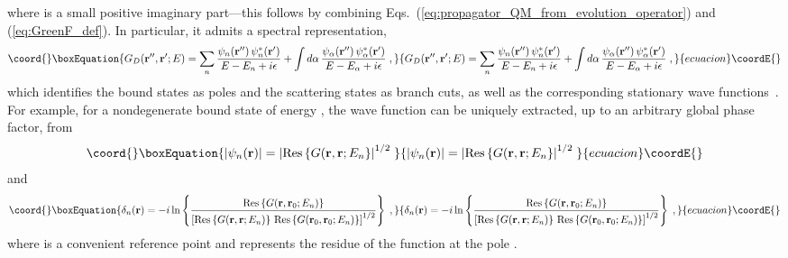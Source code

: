 \documentclass[a4paper,preprint,draft,showpacs,amsmath,amsfonts,amssymb,aps,prd]{revtex4}%
\begin{document}
where \coordHE{} is a small positive imaginary part---this follows by combining
Eqs.~(\ref{eq:propagator_QM_from_evolution_operator})
 and (\ref{eq:GreenF_def}).
In particular, it
admits a spectral representation,
\begin{equation}\coord{}\boxEquation{
G_{D} ({\bf r}'', {\bf r}' ; E) 
=
\sum_{n}
\frac{ 
\psi_{n} ({\bf r}'')  \, \psi_{n} ^{*}({\bf r}')  
}{E-E_{n} +i \epsilon}
+
\int d \alpha
\,
\frac{
\psi_{\alpha} ({\bf r}'')  \, \psi_{\alpha} ^{*}({\bf r}')  
}{E-E_{\alpha} +i \epsilon}
\;  ,
\label{eq:energy_propagator_states}
}{
G_{D} ({\bf r}'', {\bf r}' ; E) 
=
\sum_{n}
\frac{ 
\psi_{n} ({\bf r}'')  \, \psi_{n} ^{*}({\bf r}')  
}{E-E_{n} +i \epsilon}
+
\int d \alpha
\,
\frac{
\psi_{\alpha} ({\bf r}'')  \, \psi_{\alpha} ^{*}({\bf r}')  
}{E-E_{\alpha} +i \epsilon}
\;  ,
}{ecuacion}\coordE{}\end{equation}
which identifies
the bound states as poles and the scattering states 
as branch cuts, as well as the corresponding
stationary wave functions~\cite{kleinert}.
For example,
for a nondegenerate bound state of energy \coordHE{},
the wave function
\coordHE{}
can be uniquely extracted, up to an arbitrary global phase factor, from
\begin{equation}\coord{}\boxEquation{
|\psi_{n}({\bf r}) |
=
\left|
{\rm Res} \left\{ G({\bf r},{\bf r}; E_{n} 
\right\}
\right|^{1/2}
\;  
\label{eq:residue_magnitude_wf}
}{
|\psi_{n}({\bf r}) |
=
\left|
{\rm Res} \left\{ G({\bf r},{\bf r}; E_{n} 
\right\}
\right|^{1/2}
\;  
}{ecuacion}\coordE{}\end{equation}
and
\begin{equation}\coord{}\boxEquation{
\delta_{n}({\bf r}) 
=
- i \ln
\left\{
\frac{
{\rm Res} \left\{ G({\bf r},{\bf r}_{0}; E_{n} ) \right\}
}{
\left[
{\rm Res} \left\{ G({\bf r},{\bf r}; E_{n} )\right\}
\,
{\rm Res} \left\{ G({\bf r}_{0},{\bf r}_{0}; E_{n} )\right\}
\right]^{1/2}
}
\right\}
\;  ,
\label{eq:residue_phase_wf}
}{
\delta_{n}({\bf r}) 
=
- i \ln
\left\{
\frac{
{\rm Res} \left\{ G({\bf r},{\bf r}_{0}; E_{n} ) \right\}
}{
\left[
{\rm Res} \left\{ G({\bf r},{\bf r}; E_{n} )\right\}
\,
{\rm Res} \left\{ G({\bf r}_{0},{\bf r}_{0}; E_{n} )\right\}
\right]^{1/2}
}
\right\}
\;  ,
}{ecuacion}\coordE{}\end{equation}
where \coordHE{} is a convenient reference
point and \coordHE{} represents the residue of the function
\coordHE{} at the pole \coordHE{}.
\end{document}
